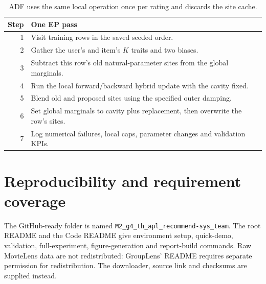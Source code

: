 \documentclass[11pt,a4paper]{article}
\newcommand{\code}[1]{\texttt{\small #1}}
\begin{document}
\begin{table}[htbp]\centering\small
\begin{tabularx}{\linewidth}{@{}rX@{}}\toprule
Step & One EP pass\\\midrule
1 & Visit training rows in the saved seeded order.\\
2 & Gather the user's and item's $K$ traits and two biases.\\
3 & Subtract this row's old natural-parameter sites from the global marginals.\\
4 & Run the local forward/backward hybrid update with the cavity fixed.\\
5 & Blend old and proposed sites using the specified outer damping.\\
6 & Set global marginals to cavity plus replacement, then overwrite the row's sites.\\
7 & Log numerical failures, local caps, parameter changes and validation KPIs.\\\bottomrule
\end{tabularx}
\caption{ADF uses the same local operation once per rating and discards the site cache.}
\end{table}

\section{Reproducibility and requirement coverage}
The GitHub-ready folder is named
\code{M2\_g4\_th\_apl\_recommend-sys\_team}. The root README and the
Code README give environment setup, quick-demo, validation, full-experiment,
figure-generation and report-build commands. Raw MovieLens data are not
redistributed: GroupLens' README requires separate permission for redistribution.
The downloader, source link and checksums are supplied instead.
\end{document}
